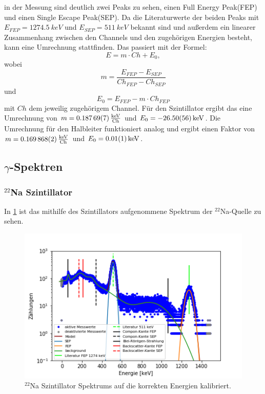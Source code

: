 in der Messung sind deutlich zwei Peaks zu sehen, einen Full Energy Peak(FEP) und einen Single Escape Peak(SEP). Da die Literaturwerte der beiden Peaks mit $E_{FEP} = \SI{1274.5}{keV}$ und $E_{SEP} = \SI{511}{keV}$ bekannt sind und außerdem ein linearer Zusammenhang zwischen den Channels und den zugehörigen Energien besteht, kann eine Umrechnung stattfinden.
Das passiert mit der Formel:
\begin{equation}
E = m \cdot Ch + E_{0},
\end{equation}  
wobei
\begin{equation}
m = \frac{E_{FEP} - E_{SEP}}{Ch_{FEP} - Ch_{SEP}}
\end{equation}
und 
\begin{equation}
E_{0} = E_{FEP} - m \cdot Ch_{FEP}
\end{equation}
mit $Ch$ dem jeweilig zugehörigem Channel. Für den Szintillator ergibt das eine Umrechnung von $m = \SI{0,18769 \pm 0,00007}{\frac{keV}{Ch}}$ und $E_{0} = \SI{-26,5 \pm 0,56}{keV}$. Die Umrechnung für den Halbleiter funktioniert analog und ergibt einen Faktor von $m = \SI{0,169868 \pm 0,000002}{\frac{keV}{Ch}}$ und $E_{0} = \SI{0,01 \pm 0,01}{keV}$. 

\subsection{$\gamma$-Spektren}

\subsubsection{$^{22}$Na Szintillator}
In \cref{na_sz} ist das mithilfe des Szintillators aufgenommene Spektrum der $^{22}$Na-Quelle zu sehen. 

\begin{figure}[ht]
	\centering
	\includegraphics[scale=0.8]{na_sz_.png}
	\caption{$^{22}$Na Szintillator Spektrums auf die korrekten Energien kalibriert.}
	\label{na_sz}
\end{figure}

